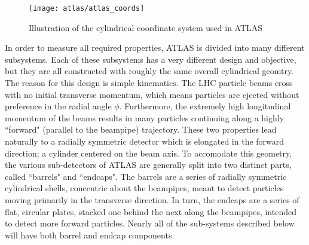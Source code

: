     \begin{figure}
        \texttt{[image: atlas/atlas\_coords]}
        \caption{Illustration of the cylindrical coordinate system used in ATLAS \cite{Schott:1699952}}
        \label{fig:atlas_coords}
    \end{figure}

    In order to measure all required properties, ATLAS is divided into many different subsystems.
    Each of these subsystems has a very different design and objective, but they are all constructed with roughly the same overall cylindrical geomtry.
    The reason for this design is simple kinematics.
    The LHC particle beams cross with no initial transverse momentum, which means particles are ejected without preference in the radial angle $\phi$.
    Furthermore, the extremely high longitudinal momentum of the beams results in many particles continuing along a highly ``forward" (parallel to the beampipe) trajectory.
    These two properties lead naturally to a radially symmetric detector which is elongated in the forward direction; a cylinder centered on the beam axis.
    To accomodate this geometry, the various sub-detectors of ATLAS are generally split into two distinct parts, called ``barrels" and ``endcaps".
    The barrels are a series of radially symmetric cylindrical shells, concentric about the beampipes, meant to detect particles moving primarily in the transverse direction.
    In turn, the endcaps are a series of flat, circular plates, stacked one behind the next along the beampipes, intended to detect more forward particles.
    Nearly all of the sub-systems described below will have both barrel and endcap components.

